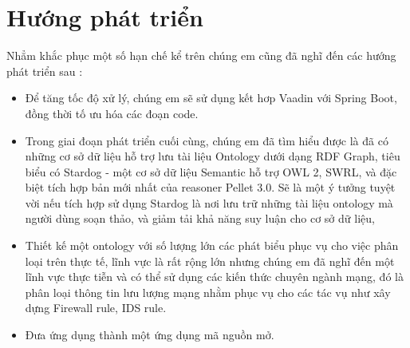\section{Hướng phát triển}
Nhẳm khắc phục một số hạn chế kể trên chúng em cũng đã nghĩ đến các hướng phát triển sau :
\begin{itemize}
\item Để tăng tốc độ xử lý, chúng em sẽ sử dụng kết hơp Vaadin với Spring Boot, đồng thời tố ưu hóa các đoạn code.
\item Trong giai đoạn phát triển cuối cùng, chúng em đã tìm hiểu được là đã có những cơ sở dữ liệu hỗ trợ lưu tài liệu Ontology dưới dạng RDF Graph, tiêu biểu có Stardog - một cơ sở dữ liệu Semantic hỗ trợ OWL 2, SWRL, và đặc biệt tích hợp bản mới nhất của reasoner Pellet 3.0. Sẽ là một ý tưởng tuyệt vời nếu tích hợp sử dụng Stardog là nơi lưu trữ những tài liệu ontology mà người dùng soạn thảo, và giảm tải khả năng suy luận cho cơ sở dữ liệu,
\item Thiết kế một ontology với số lượng lớn các phát biểu phục vụ cho việc phân loại trên thực tế, lĩnh vực là rất rộng lớn nhưng chúng em đã nghĩ đến một lĩnh vực thực tiễn và có thể sử dụng các kiến thức chuyên ngành mạng, đó là phân loại thông tin lưu lượng mạng nhằm phục vụ cho các tác vụ như xây dựng Firewall rule, IDS rule.
\item Đưa ứng dụng thành một ứng dụng mã nguồn mở.
\end{itemize}






